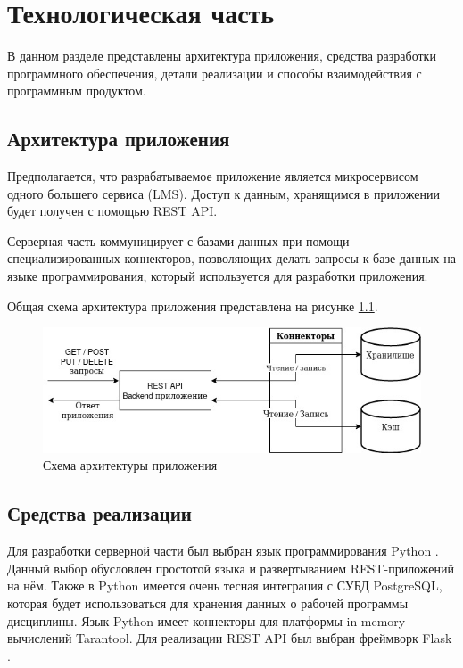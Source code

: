 \chapter{Технологическая часть}

В данном разделе представлены архитектура приложения, средства разработки программного обеспечения, детали реализации и способы взаимодействия с программным продуктом.

\section{Архитектура приложения}

Предполагается, что разрабатываемое приложение является микросервисом одного большего сервиса (LMS). Доступ к данным, хранящимся в приложении будет получен с помощью REST API.

Серверная часть коммуницирует с базами данных при помощи специализированных коннекторов, позволяющих делать запросы к базе данных на языке программирования, который используется для разработки приложения.

Общая схема архитектура приложения представлена на рисунке \ref{img:app-architecture}.

\begin{figure}[h!]
	\begin{center}
		\includegraphics[scale=0.8]{img/app-arch.jpg}
	\end{center}
	\captionsetup{justification=centering}
	\caption{Схема архитектуры приложения}
	\label{img:app-architecture}
\end{figure}

\section{Средства реализации}

Для разработки серверной части был выбран язык программирования Python \cite{python}. Данный выбор обусловлен простотой языка и развертыванием REST-приложений на нём. Также в Python имеется очень тесная интеграция с СУБД PostgreSQL, которая будет использоваться для хранения данных о рабочей программы дисциплины. Язык Python имеет коннекторы для платформы in-memory вычислений Tarantool. Для реализации REST API был выбран фреймворк Flask \cite{flask}.

